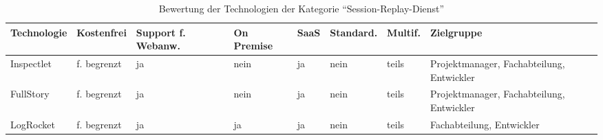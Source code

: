 \begin{table}[H]%
\centering
\addtolength{\leftskip}{-2cm}
\addtolength{\rightskip}{-2cm}
\begin{tabular}{|p{3.05cm}|p{1.8cm}|p{1.7cm}|p{1.2cm}|p{1.3cm}|p{1.7cm}|p{1.3cm}|p{2.6cm}|}
\hline
Technologie & Kostenfrei & Support f. Webanw. & On \mbox{Premise} & SaaS & Standard. & Multif. & Zielgruppe \\
\hline
Inspectlet & f. begrenzt & ja & nein & ja & nein & teils & Projektmanager, Fachabteilung, Entwickler \\
\hline
FullStory & f. begrenzt & ja & nein & ja & nein & teils & Projektmanager, Fachabteilung, Entwickler \\
\hline
LogRocket & f. begrenzt & ja & ja & ja & nein & teils & Fachabteilung, Entwickler \\
\hline
\end{tabular}
\caption{Bewertung der Technologien der Kategorie \enquote{Session-Replay-Dienst}}
\label{tab:technologie-bewertung-session-replay-dienst}
\end{table}
